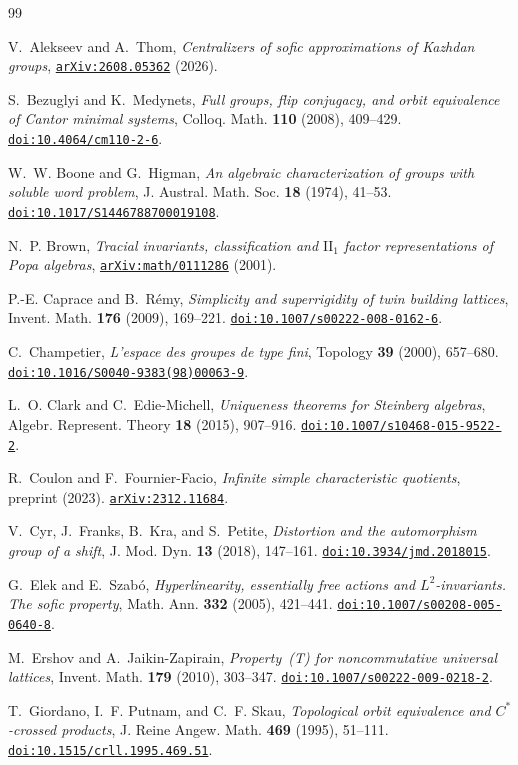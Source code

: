 \documentclass[11pt]{amsart}
\newcommand{\doi}[1]{\href{https://doi.org/#1}{\nolinkurl{doi:#1}}}
\newcommand{\arxiv}[1]{\href{https://arxiv.org/abs/#1}{\nolinkurl{arXiv:#1}}}
\begin{document}
\begin{thebibliography}{99}

V.~Alekseev and A.~Thom,
\emph{Centralizers of sofic approximations of Kazhdan groups},
\arxiv{2608.05362} (2026).

S.~Bezuglyi and K.~Medynets,
\emph{Full groups, flip conjugacy, and orbit equivalence of Cantor minimal
systems}, Colloq. Math. \textbf{110} (2008), 409--429.
\doi{10.4064/cm110-2-6}.

W.~W. Boone and G.~Higman, \emph{An algebraic characterization of groups
with soluble word problem}, J. Austral. Math. Soc. \textbf{18} (1974),
41--53. \doi{10.1017/S1446788700019108}.

N.~P. Brown, \emph{Tracial invariants, classification and
$\mathrm{II}_1$ factor representations of Popa algebras},
\arxiv{math/0111286} (2001).

P.-E. Caprace and B.~R\'emy, \emph{Simplicity and superrigidity of twin
building lattices}, Invent. Math. \textbf{176} (2009), 169--221.
\doi{10.1007/s00222-008-0162-6}.

C.~Champetier, \emph{L'espace des groupes de type fini}, Topology
\textbf{39} (2000), 657--680. \doi{10.1016/S0040-9383(98)00063-9}.

L.~O. Clark and C.~Edie-Michell, \emph{Uniqueness theorems for Steinberg
algebras}, Algebr. Represent. Theory \textbf{18} (2015), 907--916.
\doi{10.1007/s10468-015-9522-2}.

R.~Coulon and F.~Fournier-Facio, \emph{Infinite simple characteristic
quotients}, preprint (2023). \arxiv{2312.11684}.

V.~Cyr, J.~Franks, B.~Kra, and S.~Petite,
\emph{Distortion and the automorphism group of a shift},
J. Mod. Dyn. \textbf{13} (2018), 147--161. \doi{10.3934/jmd.2018015}.

G.~Elek and E.~Szab\'o, \emph{Hyperlinearity, essentially free actions and
$L^2$-invariants. The sofic property}, Math. Ann. \textbf{332} (2005),
421--441. \doi{10.1007/s00208-005-0640-8}.

M.~Ershov and A.~Jaikin-Zapirain,
\emph{Property~\textup{(T)} for noncommutative universal lattices},
Invent. Math. \textbf{179} (2010), 303--347.
\doi{10.1007/s00222-009-0218-2}.

T.~Giordano, I.~F. Putnam, and C.~F. Skau,
\emph{Topological orbit equivalence and $C^*$-crossed products},
J. Reine Angew. Math. \textbf{469} (1995), 51--111.
\doi{10.1515/crll.1995.469.51}.


\end{thebibliography}
\end{document}
